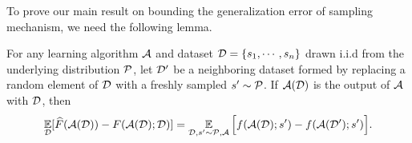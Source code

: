 
To prove our main result on bounding the generalization error of sampling mechanism, we need the following lemma.


\begin{lemma}
\label{lm:generalization_error_erm}
For any learning algorithm $\mathcal A$ and dataset $\mathcal D=\{s_1,\cdots,s_n\}$ drawn i.i.d from the underlying distribution $\mathcal P$, let $\mathcal D'$ be a neighboring dataset formed by replacing a random element of $\mathcal D$ with a freshly sampled $s'\sim \mathcal P$. If $\mathcal A(\mathcal D)$ is the output of $\mathcal A$ with $\mathcal D$, then
\begin{align*}
    \operatorname*{\mathbb{E}}_{\mathcal D}[\widehat{F}(\mathcal A(\mathcal D))-F(\mathcal A(\mathcal D);\mathcal D)]=\operatorname*{\mathbb{E}}_{\mathcal D,s'\sim\mathcal P,\mathcal A}\Big[f(\mathcal A(\mathcal D);s')-f(\mathcal A(\mathcal D');s') \Big].
\end{align*}
\end{lemma}

